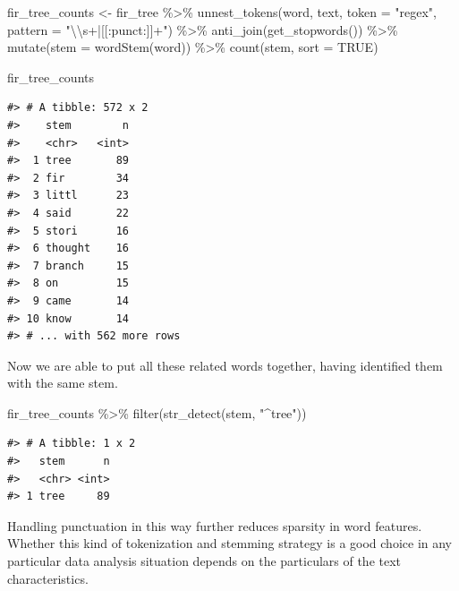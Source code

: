 \documentclass[
]{krantz}
\makeatletter
\newenvironment{Shaded}{\begin{snugshade}}{\end{snugshade}}
\newcommand{\AttributeTok}[1]{\textcolor[rgb]{0.77,0.63,0.00}{#1}}
\newcommand{\ConstantTok}[1]{\textcolor[rgb]{0.00,0.00,0.00}{#1}}
\newcommand{\FunctionTok}[1]{\textcolor[rgb]{0.00,0.00,0.00}{#1}}
\newcommand{\NormalTok}[1]{#1}
\newcommand{\OtherTok}[1]{\textcolor[rgb]{0.56,0.35,0.01}{#1}}
\newcommand{\SpecialCharTok}[1]{\textcolor[rgb]{0.00,0.00,0.00}{#1}}
\newcommand{\StringTok}[1]{\textcolor[rgb]{0.31,0.60,0.02}{#1}}
\newenvironment{kframe}{%
\medskip{}
\setlength{\fboxsep}{.8em}
 \def\at@end@of@kframe{}%
 \ifinner\ifhmode%
  \def\at@end@of@kframe{\end{minipage}}%
  \begin{minipage}{\columnwidth}%
 \fi\fi%
 \def\FrameCommand##1{\hskip\@totalleftmargin \hskip-\fboxsep
 \colorbox{shadecolor}{##1}\hskip-\fboxsep
     \hskip-\linewidth \hskip-\@totalleftmargin \hskip\columnwidth}%
 \MakeFramed {\advance\hsize-\width
   \@totalleftmargin\z@ \linewidth\hsize
   \@setminipage}}%
 {\par\unskip\endMakeFramed%
 \at@end@of@kframe}
\renewenvironment{Shaded}{\begin{kframe}}{\end{kframe}}
\makeatother
\begin{document}
\begin{Shaded}
\begin{Highlighting}[]
\NormalTok{fir\_tree\_counts }\OtherTok{\textless{}{-}}\NormalTok{ fir\_tree }\SpecialCharTok{\%\textgreater{}\%}
  \FunctionTok{unnest\_tokens}\NormalTok{(word, text, }\AttributeTok{token =} \StringTok{"regex"}\NormalTok{, }\AttributeTok{pattern =} \StringTok{"}\SpecialCharTok{\textbackslash{}\textbackslash{}}\StringTok{s+|[[:punct:]]+"}\NormalTok{) }\SpecialCharTok{\%\textgreater{}\%}
  \FunctionTok{anti\_join}\NormalTok{(}\FunctionTok{get\_stopwords}\NormalTok{()) }\SpecialCharTok{\%\textgreater{}\%}
  \FunctionTok{mutate}\NormalTok{(}\AttributeTok{stem =} \FunctionTok{wordStem}\NormalTok{(word)) }\SpecialCharTok{\%\textgreater{}\%}
  \FunctionTok{count}\NormalTok{(stem, }\AttributeTok{sort =} \ConstantTok{TRUE}\NormalTok{)}

\NormalTok{fir\_tree\_counts}
\end{Highlighting}
\end{Shaded}

\begin{verbatim}
#> # A tibble: 572 x 2
#>    stem        n
#>    <chr>   <int>
#>  1 tree       89
#>  2 fir        34
#>  3 littl      23
#>  4 said       22
#>  5 stori      16
#>  6 thought    16
#>  7 branch     15
#>  8 on         15
#>  9 came       14
#> 10 know       14
#> # ... with 562 more rows
\end{verbatim}

Now we are able to put all these related words together, having identified them with the same stem.

\begin{Shaded}
\begin{Highlighting}[]
\NormalTok{fir\_tree\_counts }\SpecialCharTok{\%\textgreater{}\%}
  \FunctionTok{filter}\NormalTok{(}\FunctionTok{str\_detect}\NormalTok{(stem, }\StringTok{"\^{}tree"}\NormalTok{))}
\end{Highlighting}
\end{Shaded}

\begin{verbatim}
#> # A tibble: 1 x 2
#>   stem      n
#>   <chr> <int>
#> 1 tree     89
\end{verbatim}

Handling punctuation in this way further reduces sparsity in word features. Whether this kind of tokenization and stemming strategy is a good choice in any particular data analysis situation depends on the particulars of the text characteristics.
\end{document}

